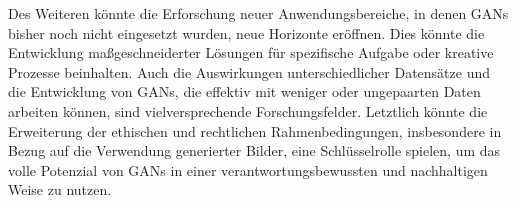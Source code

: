Des Weiteren könnte die Erforschung neuer Anwendungsbereiche, in denen GANs bisher noch nicht eingesetzt wurden, neue Horizonte eröffnen. Dies könnte die Entwicklung maßgeschneiderter Lösungen für spezifische Aufgabe oder kreative Prozesse beinhalten. Auch die Auswirkungen unterschiedlicher Datensätze und die Entwicklung von GANs, die effektiv mit weniger oder ungepaarten Daten arbeiten können, sind vielversprechende Forschungsfelder. Letztlich könnte die Erweiterung der ethischen und rechtlichen Rahmenbedingungen, insbesondere in Bezug auf die Verwendung generierter Bilder, eine Schlüsselrolle spielen, um das volle Potenzial von GANs in einer verantwortungsbewussten und nachhaltigen Weise zu nutzen.
